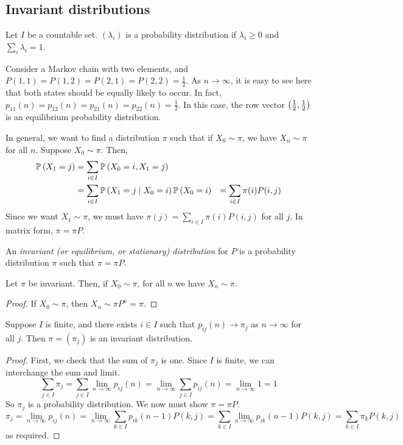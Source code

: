 \subsection{Invariant distributions}
Let \( I \) be a countable set.
\( (\lambda_i) \) is a probability distribution if \( \lambda_i \geq 0 \) and \( \sum_i \lambda_i = 1 \).
\begin{example}
	Consider a Markov chain with two elements, and \( P(1,1) = P(1,2) = P(2,1) = P(2,2) = \frac{1}{2} \).
	As \( n \to \infty \), it is easy to see here that both states should be equally likely to occur.
	In fact, \( p_{11}(n) = p_{12}(n) = p_{21}(n) = p_{22}(n) = \frac{1}{2} \).
	In this case, the row vector \( \qty(\frac{1}{2}, \frac{1}{2}) \) is an equilibrium probability distribution.
\end{example}
In general, we want to find a distribution \( \pi \) such that if \( X_0 \sim \pi \), we have \( X_n \sim \pi \) for all \( n \).
Suppose \( X_0 \sim \pi \).
Then,
\begin{align*}
	\mathbb{P}\left({X_1 = j}\right) & = \sum_{i \in I} \mathbb{P}\left({X_0 = i, X_1 = j}\right)                   \\
	               & = \sum_{i \in I} \mathbb{P}\left({X_1 = j \mid X_0 = i}\right)\mathbb{P}\left({X_0 = i}\right)
	               & = \sum_{i \in I} \pi(i) P(i,j)
\end{align*}
Since we want \( X_1 \sim \pi \), we must have \( \pi(j) = \sum_{i \in I} \pi(i) P(i,j) \) for all \( j \).
In matrix form, \( \pi = \pi P \).
\begin{definition}
	An \textit{invariant (or equilibrium, or stationary) distribution} for \( P \) is a probability distribution \( \pi \) such that \( \pi = \pi P \).
\end{definition}
\begin{theorem}
	Let \( \pi \) be invariant.
	Then, if \( X_0 \sim \pi \), for all \( n \) we have \( X_n \sim \pi \).
\end{theorem}
\begin{proof}
	If \( X_0 \sim \pi \), then \( X_n \sim \pi P^n = \pi \).
\end{proof}
\begin{theorem}
	Suppose \( I \) is finite, and there exists \( i \in I \) such that \( p_{ij}(n) \to \pi_j \) as \( n \to \infty \) for all \( j \).
	Then \( \pi = (\pi_j) \) is an invariant distribution.
\end{theorem}
\begin{proof}
	First, we check that the sum of \( \pi_j \) is one.
	Since \( I \) is finite, we can interchange the sum and limit.
	\[
		\sum_{j \in I} \pi_j = \sum_{j \in I} \lim_{n \to \infty} p_{ij}(n) = \lim_{n \to \infty} \sum_{j \in I} p_{ij}(n) = \lim_{n \to \infty} 1 = 1
	\]
	So \( \pi_j \) is a probability distribution.
	We now must show \( \pi = \pi P \).
	\[
		\pi_j = \lim_{n \to \infty} p_{ij}(n) = \lim_{n \to \infty} \sum_{k \in I} p_{ik}(n-1) P(k,j) = \sum_{k \in I} \lim_{n \to \infty} p_{ik}(n-1) P(k,j) = \sum_{k \in I} \pi_k P(k,j)
	\]
	as required.
\end{proof}
